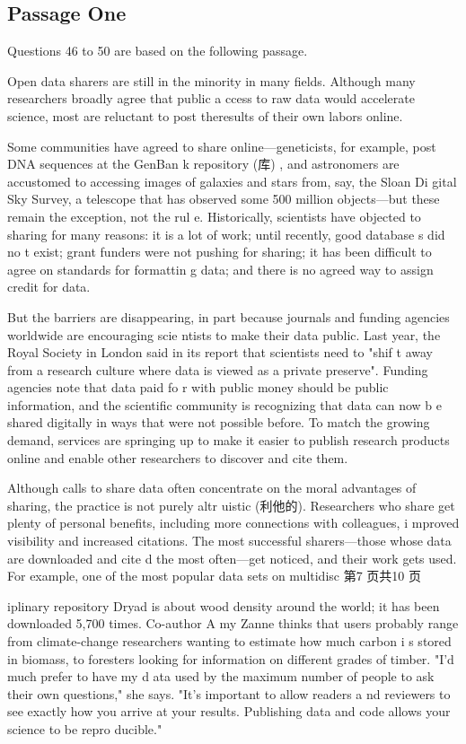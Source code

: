 \documentclass[UTF8,11pt]{ctexart}
\begin{document}
\subsection*{Passage One}


Questions 46 to 50 are based on the following passage.


Open data sharers are still in the minority in many fields. Although many researchers broadly agree that public a ccess to raw data would accelerate science, most are reluctant to post theresults of their own labors online.


Some communities have agreed to share online—geneticists, for example, post DNA sequences at the GenBan k repository (库) , and astronomers are accustomed to accessing images of galaxies and stars from, say, the Sloan Di gital Sky Survey, a telescope that has observed some 500 million objects—but these remain the exception, not the rul e. Historically, scientists have objected to sharing for many reasons: it is a lot of work; until recently, good database s did no t exist; grant funders were not pushing for sharing; it has been difficult to agree on standards for formattin g data; and there is no agreed way to assign credit for data.


But the barriers are disappearing, in part because journals and funding agencies worldwide are encouraging scie ntists to make their data public. Last year, the Royal Society in London said in its report that scientists need to "shif t away from a research culture where data is viewed as a private preserve". Funding agencies note that data paid fo r with public money should be public information, and the scientific community is recognizing that data can now b e shared digitally in ways that were not possible before. To match the growing demand, services are springing up to make it easier to publish research products online and enable other researchers to discover and cite them.


Although calls to share data often concentrate on the moral advantages of sharing, the practice is not purely altr uistic (利他的). Researchers who share get plenty of personal benefits, including more connections with colleagues, i mproved visibility and increased citations. The most successful sharers—those whose data are downloaded and cite d the most often---get noticed, and their work gets used. For example, one of the most popular data sets on multidisc 第7 页共10 页


iplinary repository Dryad is about wood density around the world; it has been downloaded 5,700 times. Co-author A my Zanne thinks that users probably range from climate-change researchers wanting to estimate how much carbon i s stored in biomass, to foresters looking for information on different grades of timber. "I'd much prefer to have my d ata used by the maximum number of people to ask their own questions," she says. "It's important to allow readers a nd reviewers to see exactly how you arrive at your results. Publishing data and code allows your science to be repro ducible."
\end{document}
